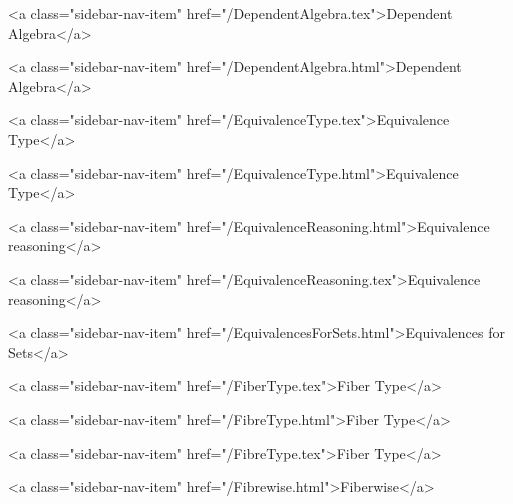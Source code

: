       
    
      
        
          <a class="sidebar-nav-item" href="/DependentAlgebra.tex">Dependent Algebra</a>
        
      
    
      
        
          <a class="sidebar-nav-item" href="/DependentAlgebra.html">Dependent Algebra</a>
        
      
    
      
        
          <a class="sidebar-nav-item" href="/EquivalenceType.tex">Equivalence Type</a>
        
      
    
      
        
          <a class="sidebar-nav-item" href="/EquivalenceType.html">Equivalence Type</a>
        
      
    
      
        
          <a class="sidebar-nav-item" href="/EquivalenceReasoning.html">Equivalence reasoning</a>
        
      
    
      
        
          <a class="sidebar-nav-item" href="/EquivalenceReasoning.tex">Equivalence reasoning</a>
        
      
    
      
        
          <a class="sidebar-nav-item" href="/EquivalencesForSets.html">Equivalences for Sets</a>
        
      
    
      
        
          <a class="sidebar-nav-item" href="/FiberType.tex">Fiber Type</a>
        
      
    
      
        
          <a class="sidebar-nav-item" href="/FibreType.html">Fiber Type</a>
        
      
    
      
        
          <a class="sidebar-nav-item" href="/FibreType.tex">Fiber Type</a>
        
      
    
      
        
          <a class="sidebar-nav-item" href="/Fibrewise.html">Fiberwise</a>
        
